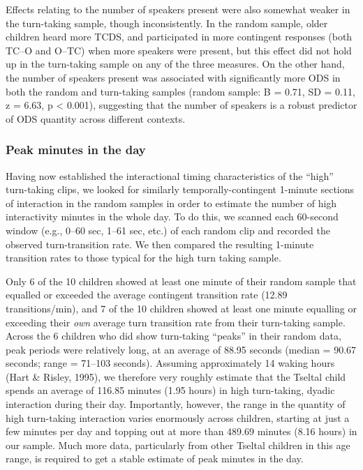 \documentclass[floatsintext,man]{apa6}
\theoremstyle{definition}
\theoremstyle{definition}
\theoremstyle{definition}
\theoremstyle{remark}
\begin{document}
Effects relating to the number of speakers present were also somewhat
weaker in the turn-taking sample, though inconsistently. In the random
sample, older children heard more TCDS, and participated in more
contingent responses (both TC--O and O--TC) when more speakers were
present, but this effect did not hold up in the turn-taking sample on
any of the three measures. On the other hand, the number of speakers
present was associated with significantly more ODS in both the random
and turn-taking samples (random sample: B = 0.71, SD = 0.11, z = 6.63, p
\textless{} 0.001), suggesting that the number of speakers is a robust
predictor of ODS quantity across different contexts.

\subsubsection{Peak minutes in the day}\label{peak-minutes-in-the-day}

Having now established the interactional timing characteristics of the
\enquote{high} turn-taking clips, we looked for similarly
temporally-contingent 1-minute sections of interaction in the random
samples in order to estimate the number of high interactivity minutes in
the whole day. To do this, we scanned each 60-second window (e.g., 0--60
sec, 1--61 sec, etc.) of each random clip and recorded the observed
turn-transition rate. We then compared the resulting 1-minute transition
rates to those typical for the high turn taking sample.

Only 6 of the 10 children showed at least one minute of their random
sample that equalled or exceeded the average contingent transition rate
(12.89 transitions/min), and 7 of the 10 children showed at least one
minute equalling or exceeding their \emph{own} average turn transition
rate from their turn-taking sample. Across the 6 children who did show
turn-taking \enquote{peaks} in their random data, peak periods were
relatively long, at an average of 88.95 seconds (median = 90.67 seconds;
range = 71--103 seconds). Assuming approximately 14 waking hours (Hart
\& Risley, 1995), we therefore very roughly estimate that the Tseltal
child spends an average of 116.85 minutes (1.95 hours) in high
turn-taking, dyadic interaction during their day. Importantly, however,
the range in the quantity of high turn-taking interaction varies
enormously across children, starting at just a few minutes per day and
topping out at more than 489.69 minutes (8.16 hours) in our sample. Much
more data, particularly from other Tseltal children in this age range,
is required to get a stable estimate of peak minutes in the day.
\end{document}
